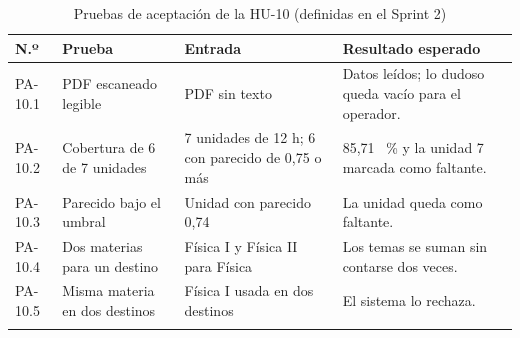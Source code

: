 \begin{longtable}{|p{1.4cm}|p{3.7cm}|p{4.6cm}|p{5.1cm}|}
\hline\rowcolor{grisTarjeta}\textbf{N.º} & \textbf{Prueba} & \textbf{Entrada} & \textbf{Resultado esperado}\\\hline
\endhead
PA-10.1 & PDF escaneado legible & PDF sin texto & Datos leídos; lo dudoso queda vacío para el operador.\\\hline
PA-10.2 & Cobertura de 6 de 7 unidades & 7 unidades de 12 h; 6 con parecido de 0,75 o más & 85,71 ~\% y la unidad 7 marcada como faltante.\\\hline
PA-10.3 & Parecido bajo el umbral & Unidad con parecido 0,74 & La unidad queda como faltante.\\\hline
PA-10.4 & Dos materias para un destino & Física I y Física II para Física & Los temas se suman sin contarse dos veces.\\\hline
PA-10.5 & Misma materia en dos destinos & Física I usada en dos destinos & El sistema lo rechaza.\\\hline
\caption{Pruebas de aceptación de la HU-10 (definidas en el Sprint 2)}
\end{longtable}


